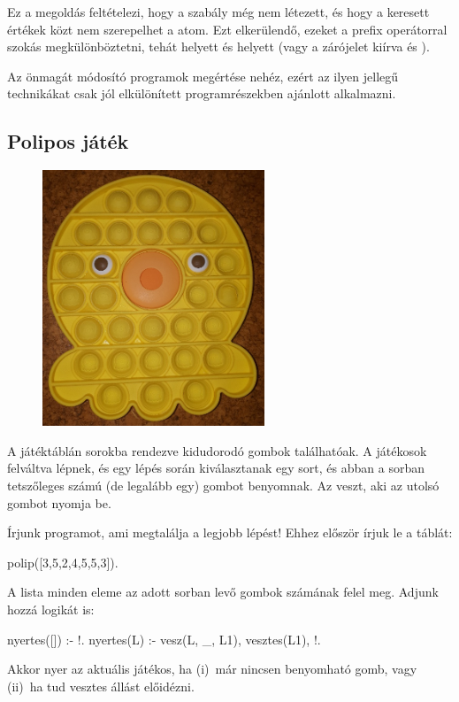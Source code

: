 Ez a megoldás feltételezi, hogy a 
szabály még nem létezett, és hogy a keresett értékek
közt nem szerepelhet a  atom. Ezt
elkerülendő, ezeket a \pr{\$} prefix operátorral
szokás megkülönböztetni, tehát 
helyett  és  helyett
 (vagy a zárójelet kiírva
 és ).

Az önmagát módosító programok megértése nehéz, ezért
az ilyen jellegű technikákat csak jól elkülönített
programrészekben ajánlott alkalmazni.

\subsection*{Polipos játék}
\begin{figure}
  \centering
  \includegraphics[width=.35\textwidth]{images/polip.png}
\end{figure}
A játéktáblán sorokba rendezve kidudorodó gombok találhatóak.
A játékosok felváltva lépnek, és egy lépés során kiválasztanak egy sort,
és abban a sorban tetszőleges számú (de legalább egy) gombot benyomnak.
Az veszt, aki az utolsó gombot nyomja be.

Írjunk programot, ami megtalálja a legjobb lépést! Ehhez először írjuk le a táblát:
\begin{program}
polip([3,5,2,4,5,5,3]).
\end{program}
A lista minden eleme az adott sorban levő gombok számának felel meg.
Adjunk hozzá logikát is:
\begin{program}
nyertes([]) :- !. 
nyertes(L) :- vesz(L, _, L1), vesztes(L1), !.
\end{program}
Akkor nyer az aktuális játékos, ha (i)~már nincsen benyomható gomb, vagy
(ii)~ha tud vesztes állást előidézni.

